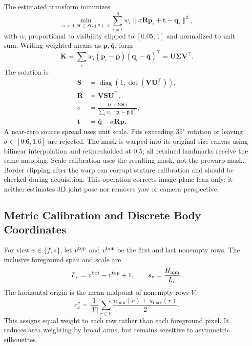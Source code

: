 The estimated transform minimizes
\begin{equation}
\min_{\sigma>0,\,\mathbf R\in SO(2),\,\mathbf t}
\sum_{i=1}^{6}w_i\|\sigma\mathbf R\mathbf p_i+\mathbf t-\mathbf q_i\|^2,
\label{eq:procrustes_objective}
\end{equation}
with $w_i$ proportional to visibility clipped to $[0.05,1]$ and normalized to unit sum. Writing weighted means as $\bar{\mathbf p},\bar{\mathbf q}$, form
\begin{equation}
\mathbf K=\sum_iw_i(\mathbf p_i-\bar{\mathbf p})(\mathbf q_i-\bar{\mathbf q})^\top
=\mathbf U\mathbf\Sigma\mathbf V^\top.
\label{eq:svd_cov}
\end{equation}
The solution is
\begin{align}
\mathbf S&=\operatorname{diag}(1,\det(\mathbf V\mathbf U^\top)),\nonumber\\
\mathbf R&=\mathbf V\mathbf S\mathbf U^\top,\label{eq:rotation}\\
\sigma&=\frac{\operatorname{tr}(\mathbf\Sigma\mathbf S)}{\sum_iw_i\|\mathbf p_i-\bar{\mathbf p}\|^2},\label{eq:procrustes_scale_trans}\\
\mathbf t&=\bar{\mathbf q}-\sigma\mathbf R\bar{\mathbf p}.\nonumber
\end{align}
A near-zero source spread uses unit scale. Fits exceeding $35^\circ$ rotation or leaving $\sigma\in[0.6,1.6]$ are rejected. The mask is warped into its original-size canvas using bilinear interpolation and rethresholded at $0.5$; all retained landmarks receive the same mapping. Scale calibration uses the resulting mask, not the prewarp mask. Border clipping after the warp can corrupt stature calibration and should be checked during acquisition. This operation corrects image-plane lean only; it neither estimates 3D joint pose nor removes yaw or camera perspective.

\subsection{Metric Calibration and Discrete Body Coordinates}
\label{subsec:calibration}
For view $v\in\{f,s\}$, let $v^{\rm top}$ and $v^{\rm bot}$ be the first and last nonempty rows. The inclusive foreground span and scale are
\begin{equation}
L_v=v^{\rm bot}-v^{\rm top}+1,\qquad s_v=\frac{H_{\rm mm}}{L_v}.
\label{eq:scale_front}
\end{equation}
The horizontal origin is the mean midpoint of nonempty rows $\mathcal V$,
\begin{equation}
c_x^v=\frac{1}{|\mathcal V|}\sum_{r\in\mathcal V}\frac{u_{\min}(r)+u_{\max}(r)}{2}.
\label{eq:centerline}
\end{equation}
This assigns equal weight to each row rather than each foreground pixel. It reduces area weighting by broad arms, but remains sensitive to asymmetric silhouettes.

